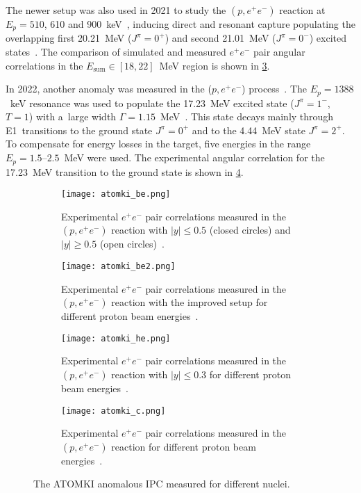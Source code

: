 			The newer setup was also used in 2021 to study the $(p,e^+ e^-)$ reaction at $E_p = 510$, 610 and 900~keV~\cite{atomki_he2}, inducing direct and resonant capture populating the overlapping first 20.21~MeV ($J^\pi = 0^+$) and second 21.01~MeV ($J^\pi = 0^-$) excited states~\cite{resonances2}. The comparison of simulated and measured $e^+e^-$ pair angular correlations in the ${E_\text{sum}\in[18,22]}$~MeV region is shown in \cref{fig:atomki_he}.
			
			In 2022, another anomaly was measured in the ($p,e^+e^-$) process~\cite{atomki_c}. The $E_p = 1388$~keV resonance was used to populate the 17.23~MeV excited state ($J^\pi = 1^-$, $T = 1$) with a~large width $\Gamma = 1.15$~MeV~\cite{resonances3}. This state decays mainly through E1~transitions to the ground state $J^\pi = 0^+$ and to the 4.44~MeV state $J^\pi = 2^+$. To compensate for energy losses in the target, five energies in the range $E_p = 1.5\text{--}2.5$~MeV were used. The experimental angular correlation for the 17.23~MeV transition to the ground state is shown in \cref{fig:atomki_c}.
			
				\begin{figure}
					\centering
					\begin{subfigure}[t]{0.48\textwidth}
						\centering
						\texttt{[image: atomki\_be.png]}
						\caption{Experimental $e^+e^-$ pair correlations measured in the $(p,e^+e^-)$ reaction with $|y| \leq 0.5$ (closed circles) and $|y| \geq 0.5$ (open circles)~\cite{atomki_be}.}
						\label{fig:atomki_be}
					\end{subfigure}
					\hfill
					\begin{subfigure}[t]{0.42\textwidth}
						\centering
						\texttt{[image: atomki\_be2.png]}
						\caption{Experimental $e^+e^-$ pair correlations measured in the $(p,e^+e^-)$ reaction with the improved setup for different proton beam energies~\cite{atomki_be2}.}
						\label{fig:atomki_be2}
					\end{subfigure}
					\begin{subfigure}[t]{0.45\textwidth}
						\centering
						\texttt{[image: atomki\_he.png]}
						\caption{Experimental $e^+e^-$ pair correlations measured in the $(p,e^+e^-)$ reaction with $|y| \leq 0.3$ for different proton beam energies~\cite{atomki_he2}.}
						\label{fig:atomki_he}
					\end{subfigure}
					\hfill
					\begin{subfigure}[t]{0.45\textwidth}
						\centering
						\texttt{[image: atomki\_c.png]}
						\caption{Experimental $e^+e^-$ pair correlations measured in the $(p,e^+e^-)$ reaction for different proton beam energies~\cite{atomki_c}.}
						\label{fig:atomki_c}
					\end{subfigure}
					\caption{The ATOMKI anomalous \ac{IPC} measured for different nuclei.}
					\label{fig:atomki}
				\end{figure}
			
